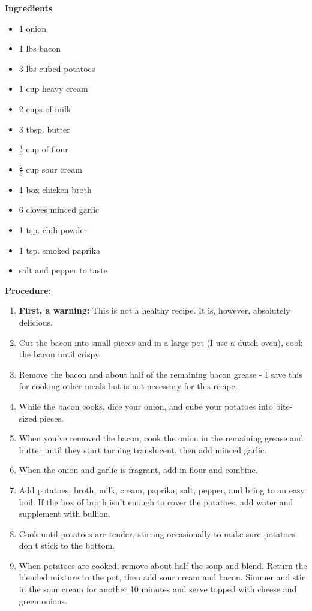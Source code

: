 \begin{multicols}{2}
\textbf{Ingredients}
\begin{itemize}
\item 1 onion 
\item 1 lbs bacon 
\item 3 lbs cubed potatoes 
\item 1 cup heavy cream 
\item 2 cups of milk 
\item 3 tbsp. butter 
\item $\frac{1}{3}$ cup of flour 
\item $\frac{2}{3}$ cup sour cream 
\item 1 box chicken broth 
\item 6 cloves minced garlic
\item 1 tsp. chili powder
\item 1 tsp. smoked paprika
\item salt and pepper to taste 


\end{itemize}


\columnbreak
\textbf{Procedure:}
\medskip


\begin{enumerate}
\item \textbf{First, a warning:} This is not a healthy recipe. It is, however, absolutely delicious. 
\item Cut the bacon into small pieces and in a large pot (I use a dutch oven), cook the bacon until crispy. \item Remove the bacon and about half of the remaining bacon grease - I save this for cooking other meals but is not necessary for this recipe. 


\medskip
\item While the bacon cooks, dice your onion, and cube your potatoes into bite-sized pieces. 
\item When you've removed the bacon, cook the onion in the remaining grease and butter until they start turning translucent, then add minced garlic. 

\item When the onion and garlic is fragrant, add in flour and combine. 

\item Add potatoes, broth, milk, cream, paprika, salt, pepper, and bring to an easy boil. If the box of broth isn't enough to cover the potatoes, add water and supplement with bullion. 
\item Cook until potatoes are tender, stirring occasionally to make sure potatoes don't stick to the bottom. 
\item When potatoes are cooked, remove about half the soup and blend. Return the blended mixture to the pot, then add sour cream and bacon. Simmer and stir in the sour cream for another 10 minutes and serve topped with cheese and green onions. 
  
\end{enumerate}

\end{multicols}
